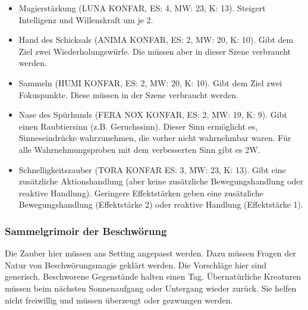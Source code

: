 \documentclass{article}
\begin{document}
\begin{itemize}
\item Magierstärkung (LUNA KONFAR, ES: 4, MW: 23, K: 13). Steigert Intelligenz und Willenskraft um je 2.
\item Hand des Schicksals (ANIMA KONFAR, ES: 2, MW: 20, K: 10). Gibt dem Ziel zwei Wiederholungswürfe. Die müssen aber in dieser Szene verbraucht werden.
\item Sammeln (HUMI KONFAR, ES: 2, MW: 20, K: 10). Gibt dem Ziel zwei Fokuspunkte. Diese müssen in der Szene verbraucht werden.
\item Nase des Spürhunds (FERA NOX KONFAR, ES: 2, MW: 19, K: 9). Gibt einen Raubtiersinn (z.B. Geruchssinn). Dieser Sinn ermöglicht es, Sinneseindrücke wahrzunehmen, die vorher nicht wahrnehmbar waren. Für alle Wahrnehmungsproben mit dem verbesserten Sinn gibt es 2W.
\item Schnelligkeitszauber (TORA KONFAR ES: 3, MW: 23, K: 13). Gibt eine zusätzliche Aktionshandlung (aber keine zusätzliche Bewegungshandlung oder reaktive Handlung). Geringere Effektstärken geben eine zusätzliche Bewegungshandlung (Effektstärke 2) oder reaktive Handlung (Effektstärke 1).
\end{itemize}

\subsubsection{Sammelgrimoir der Beschwörung}

Die Zauber hier müssen ans Setting angepasst werden. Dazu müssen Fragen der Natur von Beschwörungsmagie geklärt werden.
Die Vorschläge hier sind generisch. Beschworene Gegenstände halten einen Tag. Übernatürliche Kreaturen müssen beim
nächsten Sonnenaufgang oder Untergang wieder zurück. Sie helfen nicht freiwillig und müssen überzeugt oder gezwungen
werden.
\end{document}
